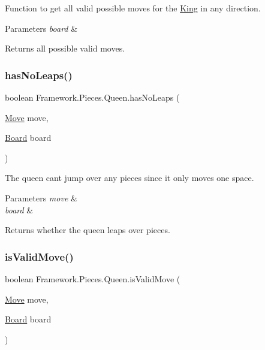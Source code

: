 Function to get all valid possible moves for the \hyperlink{class_framework_1_1_pieces_1_1_king}{King} in any direction. 
\begin{DoxyParams}{Parameters}
{\em board} & \\
\hline
\end{DoxyParams}
\begin{DoxyReturn}{Returns}
all possible valid moves. 
\end{DoxyReturn}
\hypertarget{class_framework_1_1_pieces_1_1_queen_a1225c0571579e119629d51ea7366271f}{}\label{class_framework_1_1_pieces_1_1_queen_a1225c0571579e119629d51ea7366271f} 
\subsubsection{\texorpdfstring{has\+No\+Leaps()}{hasNoLeaps()}}
{\footnotesize\ttfamily boolean Framework.\+Pieces.\+Queen.\+has\+No\+Leaps (\begin{DoxyParamCaption}\item[{\hyperlink{class_framework_1_1_move}{Move}}]{move,  }\item[{\hyperlink{class_framework_1_1_board}{Board}}]{board }\end{DoxyParamCaption})}

The queen can\textquotesingle{}t jump over any pieces since it only moves one space. 
\begin{DoxyParams}{Parameters}
{\em move} & \\
\hline
{\em board} & \\
\hline
\end{DoxyParams}
\begin{DoxyReturn}{Returns}
whether the queen leaps over pieces. 
\end{DoxyReturn}
\hypertarget{class_framework_1_1_pieces_1_1_queen_a213565b77c920684dd25ac214ea9b3e4}{}\label{class_framework_1_1_pieces_1_1_queen_a213565b77c920684dd25ac214ea9b3e4} 
\subsubsection{\texorpdfstring{is\+Valid\+Move()}{isValidMove()}}
{\footnotesize\ttfamily boolean Framework.\+Pieces.\+Queen.\+is\+Valid\+Move (\begin{DoxyParamCaption}\item[{\hyperlink{class_framework_1_1_move}{Move}}]{move,  }\item[{\hyperlink{class_framework_1_1_board}{Board}}]{board }\end{DoxyParamCaption})}

